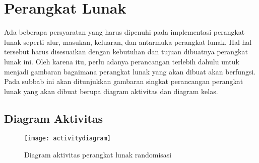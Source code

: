 \section{Perangkat Lunak}
\label{sec:pl}

Ada beberapa persyaratan yang harus dipenuhi pada implementasi perangkat lunak seperti alur, masukan, keluaran, dan antarmuka perangkat lunak. Hal-hal tersebut harus disesuaikan dengan kebutuhan dan tujuan dibuatnya perangkat lunak ini. Oleh karena itu, perlu adanya perancangan terlebih dahulu untuk menjadi gambaran bagaimana perangkat lunak yang akan dibuat akan berfungsi. Pada subbab ini akan ditunjukkan gambaran singkat perancangan perangkat lunak yang akan dibuat berupa diagram aktivitas dan diagram kelas.

\subsection{Diagram Aktivitas}
\label{sec:diagram-aktivitas}

\begin{figure}
    \centering
    \texttt{[image: activitydiagram]}
    \caption{Diagram aktivitas perangkat lunak randomisasi}
    \label{fig:activitydiagram}
\end{figure}

